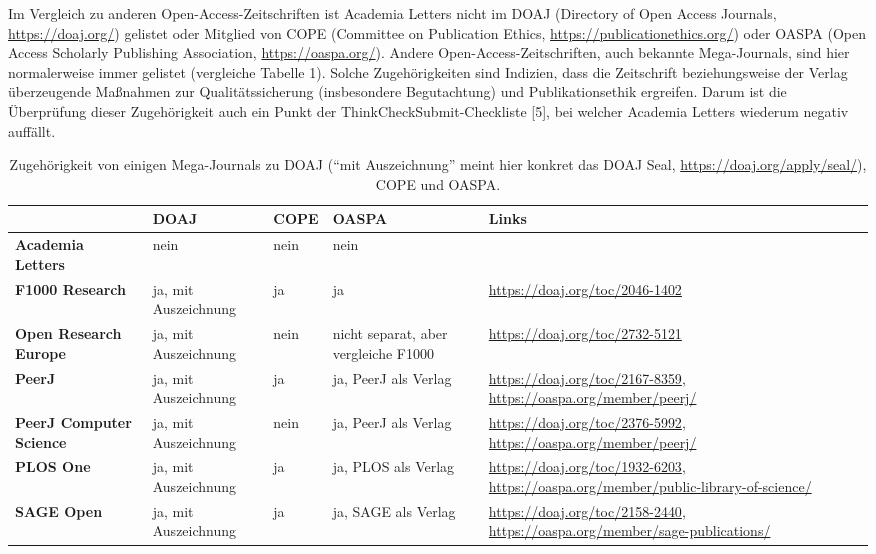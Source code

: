 \documentclass[a4paper,
fontsize=11pt,
oneside,
numbers=noperiodatend,
parskip=half-,
bibliography=totoc,
final
]{scrartcl}
\begin{document}
Im Vergleich zu anderen Open-Access-Zeitschriften ist Academia Letters
nicht im DOAJ (Directory of Open Access Journals,
\url{https://doaj.org/}) gelistet oder Mitglied von COPE (Committee on
Publication Ethics, \url{https://publicationethics.org/}) oder OASPA
(Open Access Scholarly Publishing Association,
\url{https://oaspa.org/}). Andere Open-Access-Zeitschriften, auch
bekannte Mega-Journals, sind hier normalerweise immer gelistet
(vergleiche Tabelle 1). Solche Zugehörigkeiten sind Indizien, dass die
Zeitschrift beziehungsweise der Verlag überzeugende Maßnahmen zur
Qualitätssicherung (insbesondere Begutachtung) und Publikationsethik
ergreifen. Darum ist die Überprüfung dieser Zugehörigkeit auch ein Punkt
der ThinkCheckSubmit-Checkliste {[}5{]}, bei welcher Academia Letters
wiederum negativ auffällt.

\begin{table}[!ht]
    \centering
    \begin{tabular}{p{3cm}p{2cm}lp{2cm}p{5.7cm}}
    \toprule
        \textbf{~} & \textbf{DOAJ} & \textbf{COPE} & \textbf{OASPA} & \textbf{Links} \\
        \midrule
\textbf{Academia Letters} & nein & nein & nein & ~ \\
\midrule
\textbf{F1000 Research} & ja, mit Auszeichnung & ja & ja & \url{https://doaj.org/toc/2046-1402} \\
\midrule
\textbf{Open Research Europe} & ja, mit Auszeichnung & nein & nicht separat, aber vergleiche F1000 & \url{https://doaj.org/toc/2732-5121} \\
\midrule
\textbf{PeerJ} & ja, mit Auszeichnung & ja & ja, PeerJ als Verlag & \url{https://doaj.org/toc/2167-8359}, \url{https://oaspa.org/member/peerj/} \\
\midrule
\textbf{PeerJ Computer Science} & ja, mit Auszeichnung & nein & ja, PeerJ als Verlag & \url{https://doaj.org/toc/2376-5992}, \url{https://oaspa.org/member/peerj/} \\
\midrule
\textbf{PLOS One} & ja, mit Auszeichnung & ja & ja, PLOS als Verlag & \url{https://doaj.org/toc/1932-6203}, \url{https://oaspa.org/member/public-library-of-science/} \\
\midrule
\textbf{SAGE Open} & ja, mit Auszeichnung & ja & ja, SAGE als Verlag & \url{https://doaj.org/toc/2158-2440}, \url{https://oaspa.org/member/sage-publications/} \\
        \bottomrule
            \end{tabular}
            \caption{Zugehörigkeit von einigen Mega-Journals zu DOAJ (\enquote{mit Auszeichnung} meint hier konkret das DOAJ Seal, \url{https://doaj.org/apply/seal/}), COPE und OASPA.}
\end{table}
\end{document}
